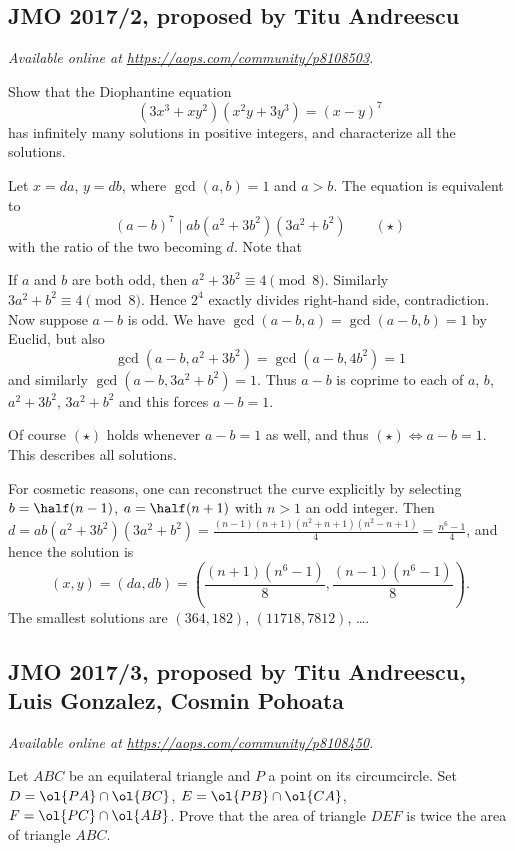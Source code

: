 \documentclass[11pt]{scrartcl}
\begin{document}
\subsection{JMO 2017/2, proposed by Titu Andreescu}
\textsl{Available online at \url{https://aops.com/community/p8108503}.}
\begin{mdframed}[style=mdpurplebox,frametitle={Problem statement}]
Show that the Diophantine equation
\[ \left( 3x^3+xy^2 \right)\left( x^2y+3y^3 \right) = (x-y)^7 \]
has infinitely many solutions in positive integers,
and characterize all the solutions.
\end{mdframed}
Let $x=da$, $y=db$, where $\gcd(a,b) = 1$ and $a > b$.
The equation is equivalent to
\[ (a-b)^7 \mid ab\left( a^2+3b^2 \right)\left( 3a^2+b^2 \right)
  \qquad (\star) \]
with the ratio of the two becoming $d$.
Note that
\begin{itemize}
  \ii If $a$ and $b$ are both odd,
  then $a^2+3b^2  \equiv 4 \pmod 8$.
  Similarly $3a^2+b^2 \equiv 4 \pmod 8$.
  Hence $2^4$ exactly divides right-hand side, contradiction.
  \ii Now suppose $a-b$ is odd.
  We have $\gcd(a-b,a) = \gcd(a-b,b) = 1$ by Euclid,
  but also
  \[ \gcd(a-b, a^2+3b^2) = \gcd(a-b, 4b^2) = 1 \]
  and similarly $\gcd(a-b, 3a^2+b^2) = 1$.
  Thus $a-b$ is coprime to each of $a$, $b$,
  $a^2+3b^2$, $3a^2+b^2$ and this forces $a-b = 1$.
\end{itemize}
Of course $(\star)$ holds whenever $a-b = 1$ as well,
and thus $(\star) \iff a-b = 1$.
This describes all solutions.

\begin{remark*}
For cosmetic reasons, one can reconstruct the curve explicitly
by selecting $b = \half (n-1)$, $a = \half (n+1)$
with $n > 1$ an odd integer.
Then $d = ab(a^2+3b^2)(3a^2+b^2) =
\frac{(n-1)(n+1)(n^2+n+1)(n^2-n+1)}{4} = \frac{n^6-1}{4}$,
and hence the solution is
\[ (x,y) = (da, db) = \left( \frac{(n+1)(n^6-1)}{8},
  \frac{(n-1)(n^6-1)}{8} \right). \]
The smallest solutions are $(364,182)$, $(11718, 7812)$, \dots.
\end{remark*}
\pagebreak

\subsection{JMO 2017/3, proposed by Titu Andreescu, Luis Gonzalez, Cosmin Pohoata}
\textsl{Available online at \url{https://aops.com/community/p8108450}.}
\begin{mdframed}[style=mdpurplebox,frametitle={Problem statement}]
Let $ABC$ be an equilateral triangle and $P$
a point on its circumcircle.
Set $D = \ol{PA} \cap \ol{BC}$, $E = \ol{PB} \cap \ol{CA}$,
$F = \ol{PC} \cap \ol{AB}$.
Prove that the area of triangle $DEF$ is
twice the area of triangle $ABC$.
\end{mdframed}
\end{document}

